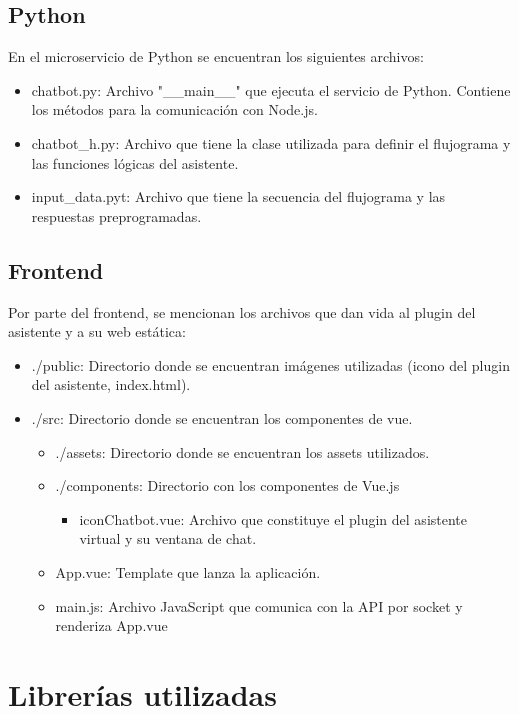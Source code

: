 \subsection{Python}

En el microservicio de Python se encuentran los siguientes archivos:

\begin{itemize}
    \item chatbot.py: Archivo "\_\_main\_\_" que ejecuta el servicio de Python. Contiene los métodos para la comunicación con Node.js.
    \item chatbot\_h.py: Archivo que tiene la clase utilizada para definir el flujograma y las funciones lógicas del asistente.
    \item input\_data.pyt: Archivo que tiene la secuencia del flujograma y las respuestas preprogramadas.
\end{itemize}


\subsection{Frontend}

Por parte del frontend, se mencionan los archivos que dan vida al plugin del asistente y a su web estática:

\begin{itemize}
    \item ./public: Directorio donde se encuentran imágenes utilizadas (icono del plugin del asistente, index.html).
    \item ./src: Directorio donde se encuentran los componentes de vue.
\begin{itemize}
        \item ./assets: Directorio donde se encuentran los assets utilizados.
        \item ./components: Directorio con los componentes de Vue.js
\begin{itemize}
            \item iconChatbot.vue: Archivo que constituye el plugin del asistente virtual y su ventana de chat.
\end{itemize}
        \item App.vue: Template que lanza la aplicación.
        \item main.js: Archivo JavaScript que comunica con la API por socket y renderiza App.vue
\end{itemize}
\end{itemize}


\section{Librerías utilizadas}


